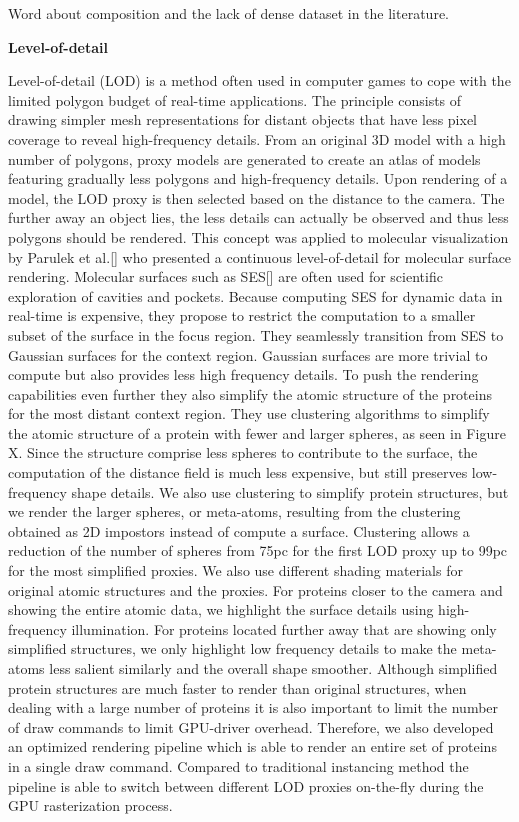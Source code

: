 Word about composition and the lack of dense dataset in the literature.

\textbf{Level-of-detail}

Level-of-detail (LOD) is a method often used in computer games to cope with the limited polygon budget of real-time applications.
The principle consists of drawing simpler mesh representations for distant objects that have less pixel coverage to reveal high-frequency details. 
From an original 3D model with a high number of polygons, proxy models are generated to create an atlas of models featuring gradually less polygons and high-frequency details.
Upon rendering of a model, the LOD proxy is then selected based on the distance to the camera.
The further away an object lies, the less details can actually be observed and thus less polygons should be rendered.
This concept was applied to molecular visualization by Parulek et al.[] who presented a continuous level-of-detail for molecular surface rendering.
Molecular surfaces such as SES[] are often used for scientific exploration of cavities and pockets.
Because computing SES for dynamic data in real-time is expensive, they propose to restrict the computation to a smaller subset of the surface in the focus region.
They seamlessly transition from SES to Gaussian surfaces for the context region.
Gaussian surfaces are more trivial to compute but also provides less high frequency details.
To push the rendering capabilities even further they also simplify the atomic structure of the proteins for the most distant context region.
They use clustering algorithms to simplify the atomic structure of a protein with fewer and larger spheres, as seen in Figure X.
Since the structure comprise less spheres to contribute to the surface, the computation of the distance field is much less expensive, but still preserves low-frequency shape details.
We also use clustering to simplify protein structures, but we render the larger spheres, or meta-atoms, resulting from the clustering obtained as 2D impostors instead of compute a surface.
Clustering allows a reduction of the number of spheres from 75pc for the first LOD proxy up to 99pc for the most simplified proxies.
We also use different shading materials for original atomic structures and the proxies.
For proteins closer to the camera and showing the entire atomic data, we highlight the surface details using high-frequency illumination.
For proteins located further away that are showing only simplified structures, we only highlight low frequency details to make the meta-atoms less salient similarly and the overall shape smoother.
Although simplified protein structures are much faster to render than original structures, when dealing with a large number of proteins it is also important to limit the number of draw commands to limit GPU-driver overhead.
Therefore, we also developed an optimized rendering pipeline which is able to render an entire set of proteins in a single draw command.
Compared to traditional instancing method the pipeline is able to switch between different LOD proxies on-the-fly during the GPU rasterization process.

